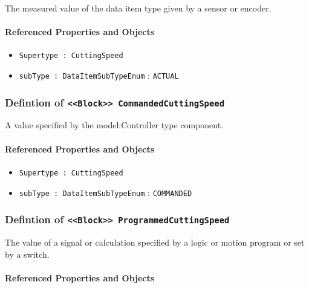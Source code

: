 The measured value of the data item type given by a sensor or encoder.

\FloatBarrier
\paragraph{Referenced Properties and Objects}

\begin{itemize}
\item \texttt{Supertype : CuttingSpeed}

\item \texttt{subType : DataItemSubTypeEnum} : \texttt{ACTUAL}

\end{itemize}
\FloatBarrier
\subsubsection{Defintion of \texttt{<<Block>> CommandedCuttingSpeed}}
  \label{type:CommandedCuttingSpeed}

\FloatBarrier

A value specified by the {model:Controller} type component.

\FloatBarrier
\paragraph{Referenced Properties and Objects}

\begin{itemize}
\item \texttt{Supertype : CuttingSpeed}

\item \texttt{subType : DataItemSubTypeEnum} : \texttt{COMMANDED}

\end{itemize}
\FloatBarrier
\subsubsection{Defintion of \texttt{<<Block>> ProgrammedCuttingSpeed}}
  \label{type:ProgrammedCuttingSpeed}

\FloatBarrier

The value of a signal or calculation specified by a logic or motion program or set by a switch.

\FloatBarrier
\paragraph{Referenced Properties and Objects}

